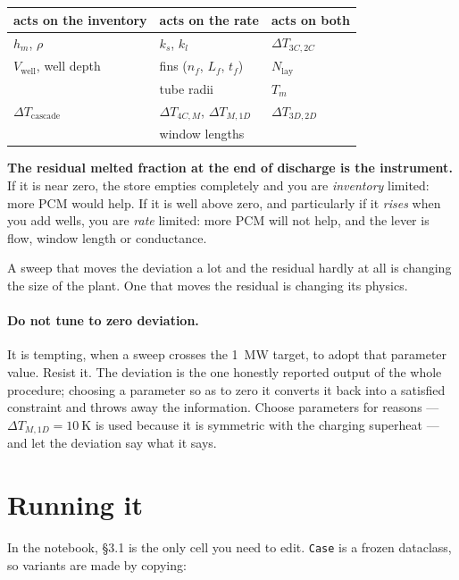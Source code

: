 \documentclass[11pt,a4paper]{article}
\newcommand{\hm}{\ensuremath{h_{m}}}
\newcommand{\Tm}{\ensuremath{T_{m}}}
\newcommand{\code}[1]{\texttt{\small #1}}
\begin{document}
\begin{center}
\begin{tabular}{@{}l l l@{}}
\toprule
acts on the \textbf{inventory} & acts on the \textbf{rate} & acts on both \\
\midrule
$\hm$, $\rho$ & $k_s$, $k_l$ & $\Delta T_{3C,2C}$ \\
$V_{\mathrm{well}}$, well depth & fins ($n_f$, $L_f$, $t_f$) & $N_{\mathrm{lay}}$ \\
 & tube radii & $\Tm$ \\
$\Delta T_{\mathrm{cascade}}$ & $\Delta T_{4C,M}$, $\Delta T_{M,1D}$ & $\Delta T_{3D,2D}$ \\
 & window lengths & \\
\bottomrule
\end{tabular}
\end{center}

\textbf{The residual melted fraction at the end of discharge is the
instrument.} If it is near zero, the store empties completely and you are
\emph{inventory} limited: more PCM would help. If it is well above zero, and
particularly if it \emph{rises} when you add wells, you are \emph{rate} limited:
more PCM will not help, and the lever is flow, window length or conductance.

A sweep that moves the deviation a lot and the residual hardly at all is
changing the size of the plant. One that moves the residual is changing its
physics.

\paragraph{Do not tune to zero deviation.}
It is tempting, when a sweep crosses the \SI{1}{\mega\watt} target, to adopt
that parameter value. Resist it. The deviation is the one honestly reported
output of the whole procedure; choosing a parameter so as to zero it converts it
back into a satisfied constraint and throws away the information. Choose
parameters for reasons --- $\Delta T_{M,1D}=\SI{10}{\kelvin}$ is used because it
is symmetric with the charging superheat --- and let the deviation say what it
says.

\section{Running it}
\label{sec:running}

In the notebook, \S3.1 is the only cell you need to edit. \code{Case} is a
frozen dataclass, so variants are made by copying:
\end{document}
